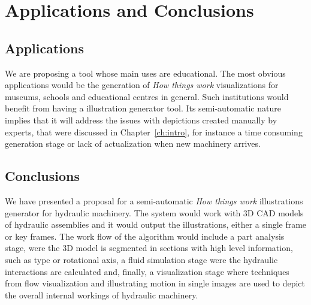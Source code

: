 \chapter{Applications and Conclusions}

\section{Applications}

We are proposing a tool whose main uses are educational.
The most obvious applications would be the generation of \textit{How things work} visualizations for museums, schools and educational centres in general.
Such institutions would benefit from having a illustration generator tool.
Its semi-automatic nature implies that it will address the issues with depictions created manually by experts, that were discussed in Chapter~\ref{ch:intro}, for instance a time consuming generation stage or lack of actualization when new machinery arrives.

\section{Conclusions}

We have presented a proposal for a semi-automatic \textit{How things work} illustrations generator for hydraulic machinery.
The system would work with 3D CAD models of hydraulic assemblies and it would output the illustrations, either a single frame or key frames.
The work flow of the algorithm would include a part analysis stage, were the 3D model is segmented in sections with high level information, such as type or rotational axis, a fluid simulation stage were the hydraulic interactions are calculated and, finally, a visualization stage where techniques from flow visualization and illustrating motion in single images are used to depict the overall internal workings of hydraulic machinery.